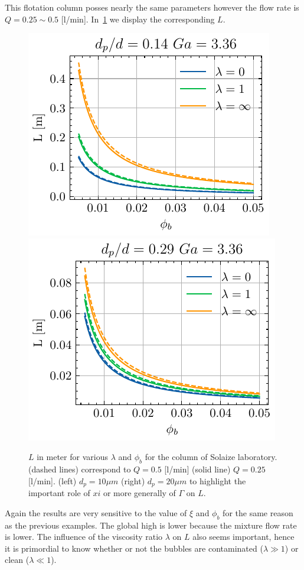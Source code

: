 This flotation column posses nearly the same parameters however the flow rate is $Q= 0.25\sim 0.5$ [l/min]. 
In~\ref{fig:height_two} we display the corresponding $L$. 

\begin{figure}[h!]
    \centering
    \includegraphics[height=0.40\textwidth]{image/flotation/examples/case_two.pdf}
    \includegraphics[height=0.40\textwidth]{image/flotation/examples/case_two_xi2.pdf}
    \caption{
    $L$ in meter for various $\lambda$ and $\phi_b$ for the column of Solaize laboratory. 
    (dashed lines) correspond to $Q=0.5$ [l/min] (solid line) $Q = 0.25$ [l/min].
    (left) $d_p = 10\mu m$
    (right) $d_p = 20\mu m$ to highlight the important role of $xi$ or more generally of $\Gamma$ on $L$. }
    \label{fig:height_two}
\end{figure}
Again the results are very sensitive to the value of $\xi$ and $\phi_b$ for the same reason as the previous examples. 
The global high is lower because the mixture flow rate is lower. 
The influence of the viscosity ratio $\lambda$ on $L$ also seems important, hence it is primordial to know whether or not the bubbles are contaminated ($\lambda \gg 1$) or clean ($\lambda \ll 1$).

\vspace{0.5cm}
\noindent
{}
    


